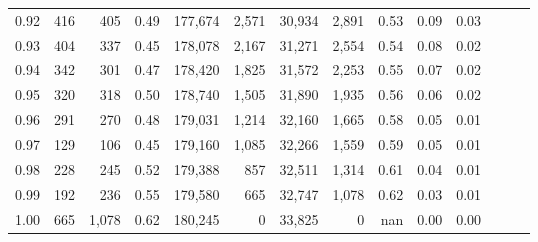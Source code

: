 \begin{tabular}{rrrrrrrrrrrrrr}
0.92 &    416 &    405 &  0.49 &  177,674 &    2,571 &  30,934 &   2,891 &  0.53 &  0.09 &      0.03 \\
0.93 &    404 &    337 &  0.45 &  178,078 &    2,167 &  31,271 &   2,554 &  0.54 &  0.08 &      0.02 \\
0.94 &    342 &    301 &  0.47 &  178,420 &    1,825 &  31,572 &   2,253 &  0.55 &  0.07 &      0.02 \\
0.95 &    320 &    318 &  0.50 &  178,740 &    1,505 &  31,890 &   1,935 &  0.56 &  0.06 &      0.02 \\
0.96 &    291 &    270 &  0.48 &  179,031 &    1,214 &  32,160 &   1,665 &  0.58 &  0.05 &      0.01 \\
0.97 &    129 &    106 &  0.45 &  179,160 &    1,085 &  32,266 &   1,559 &  0.59 &  0.05 &      0.01 \\
0.98 &    228 &    245 &  0.52 &  179,388 &      857 &  32,511 &   1,314 &  0.61 &  0.04 &      0.01 \\
0.99 &    192 &    236 &  0.55 &  179,580 &      665 &  32,747 &   1,078 &  0.62 &  0.03 &      0.01 \\
1.00 &    665 &  1,078 &  0.62 &  180,245 &        0 &  33,825 &       0 &   nan &  0.00 &      0.00 \\
\bottomrule
\end{tabular}
